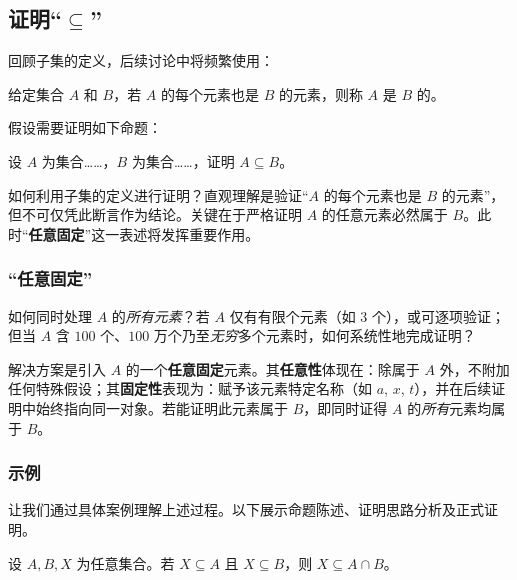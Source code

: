 \subsection{证明``$\subseteq$''}

回顾子集的定义，后续讨论中将频繁使用：

\begin{definition}
    给定集合 $A$ 和 $B$，若 $A$ 的每个元素也是 $B$ 的元素，则称 $A$ 是 $B$ 的。
\end{definition}

\clearpage

假设需要证明如下命题：
\begin{center}
    设 $A$ 为集合……，$B$ 为集合……，证明 $A \subseteq B$。
\end{center}
如何利用子集的定义进行证明？直观理解是验证``$A$ 的每个元素也是 $B$ 的元素''，但不可仅凭此断言作为结论。关键在于严格证明 $A$ 的任意元素必然属于 $B$。此时``\textbf{任意固定}''这一表述将发挥重要作用。

\subsubsection*{``任意固定''}

如何同时处理 $A$ 的\emph{所有元素}？若 $A$ 仅有有限个元素（如 $3$ 个），或可逐项验证；但当 $A$ 含 $100$ 个、$100$ 万个乃至\emph{无穷}多个元素时，如何系统性地完成证明？

解决方案是引入 $A$ 的一个\textbf{任意固定}元素。其\textbf{任意性}体现在：除属于 $A$ 外，不附加任何特殊假设；其\textbf{固定性}表现为：赋予该元素特定名称（如 $a$, $x$, $t$），并在后续证明中始终指向同一对象。若能证明此元素属于 $B$，即同时证得 $A$ 的\emph{所有}元素均属于 $B$。

\subsubsection*{示例}

让我们通过具体案例理解上述过程。以下展示命题陈述、证明思路分析及正式证明。

\begin{lemma}\label{lemma3.9.1}
    设 $A,B,X$ 为任意集合。若 $X \subseteq A$ 且 $X \subseteq B$，则 $X \subseteq A \cap B$。
\end{lemma}

